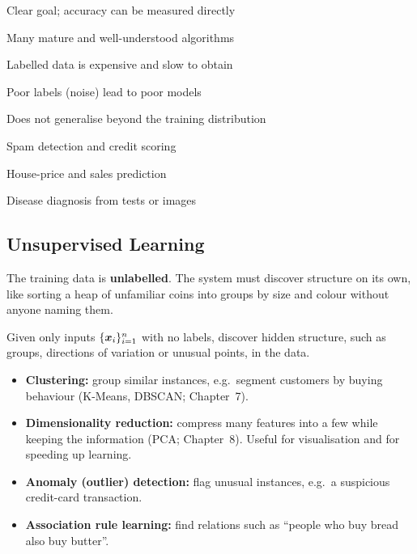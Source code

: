 {\item Clear goal; accuracy can be measured directly
 \item Many mature and well-understood algorithms}
{\item Labelled data is expensive and slow to obtain
 \item Poor labels (noise) lead to poor models
 \item Does not generalise beyond the training distribution}
{\item Spam detection and credit scoring
 \item House-price and sales prediction
 \item Disease diagnosis from tests or images}

\subsection{Unsupervised Learning}

The training data is \textbf{unlabelled}. The system must discover structure on its own, like sorting a heap of unfamiliar coins into groups by size and colour without anyone naming them.

\begin{definition}
Given only inputs $\{\boldsymbol{x}_i\}_{i=1}^n$ with no labels, discover hidden structure, such as groups, directions of variation or unusual points, in the data.
\end{definition}

\begin{itemize}
  \item \textbf{Clustering:} group similar instances, e.g.\ segment customers by buying behaviour (K-Means, DBSCAN; Chapter~7).
  \item \textbf{Dimensionality reduction:} compress many features into a few while keeping the information (PCA; Chapter~8). Useful for visualisation and for speeding up learning.
  \item \textbf{Anomaly (outlier) detection:} flag unusual instances, e.g.\ a suspicious credit-card transaction.
  \item \textbf{Association rule learning:} find relations such as ``people who buy bread also buy butter''.
\end{itemize}


